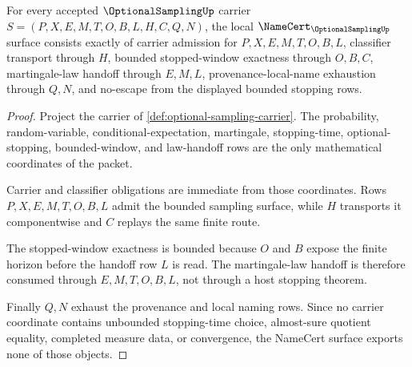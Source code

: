 \begin{theorem}
\label{thm:optional-sampling-namecert-obligations}
For every accepted $\OptionalSamplingUp$ carrier $S=(P,X,E,M,T,O,B,L,H,C,Q,N)$, the local $\NameCert_{\OptionalSamplingUp}$ surface consists exactly of carrier admission for $P,X,E,M,T,O,B,L$, classifier transport through $H$, bounded stopped-window exactness through $O,B,C$, martingale-law handoff through $E,M,L$, provenance-local-name exhaustion through $Q,N$, and no-escape from the displayed bounded stopping rows.
\end{theorem}
\begin{proof}
Project the carrier of \autoref{def:optional-sampling-carrier}. The probability, random-variable, conditional-expectation, martingale, stopping-time, optional-stopping, bounded-window, and law-handoff rows are the only mathematical coordinates of the packet.

Carrier and classifier obligations are immediate from those coordinates. Rows $P,X,E,M,T,O,B,L$ admit the bounded sampling surface, while $H$ transports it componentwise and $C$ replays the same finite route.

The stopped-window exactness is bounded because $O$ and $B$ expose the finite horizon before the handoff row $L$ is read. The martingale-law handoff is therefore consumed through $E,M,T,O,B,L$, not through a host stopping theorem.

Finally $Q,N$ exhaust the provenance and local naming rows. Since no carrier coordinate contains unbounded stopping-time choice, almost-sure quotient equality, completed measure data, or convergence, the NameCert surface exports none of those objects.
\end{proof}

